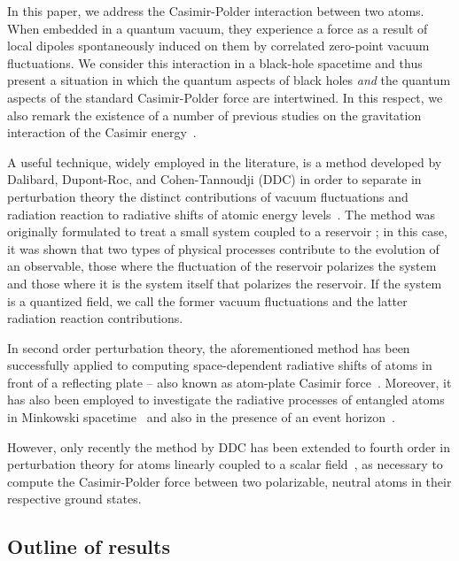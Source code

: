 \documentclass[twocolumn,prd,aps,showpacs,amsmath,amssymb]{revtex4-1}
\begin{document}
In this paper, we address the Casimir-Polder interaction between two atoms. 
When embedded in a quantum vacuum, they 
experience a force as a result of local dipoles spontaneously induced
on them by correlated zero-point  vacuum fluctuations. We
consider this interaction in a black-hole spacetime and thus present
 a situation in which the quantum aspects of
black holes {\em and} the quantum aspects of the standard
Casimir-Polder force are intertwined. In this respect, we also remark the existence of 
a number of previous studies on the gravitation interaction of 
the Casimir energy~\cite{milton}.

A useful technique, widely employed in the literature, is a method
developed by Dalibard, Dupont-Roc, and Cohen-Tannoudji (DDC) in order
to separate in perturbation theory the distinct contributions of
vacuum fluctuations and radiation reaction to radiative shifts of
atomic energy levels~\cite{cohen2}.  
%
The method was originally formulated to treat a small system coupled to a reservoir \cite{cohen3}; in this case, it was shown that two types of physical processes contribute to the evolution of an observable, those
where the fluctuation of the reservoir polarizes the system  and those where it is the system itself that polarizes the reservoir. If the system is a quantized field, we call the former vacuum fluctuations and the latter radiation reaction contributions.

In second order perturbation theory, the aforementioned method has been
successfully applied to computing space-dependent radiative shifts of atoms in
front of a reflecting plate -- also known as atom-plate Casimir
force~\cite{Rizzuto}. 
%
Moreover, it has also been employed to investigate the radiative
processes of entangled atoms in Minkowski spacetime~\cite{ng1} and also in the presence of
an event horizon~\cite{ng2,ng3}. 

However, only recently the method by DDC has been extended to fourth order in perturbation theory for atoms
linearly coupled to a scalar field~\cite{marino, noto}, as necessary to
compute the Casimir-Polder force between two polarizable, neutral atoms in their respective
ground states. 

 
 \subsection*{Outline of results}
 
\end{document}
